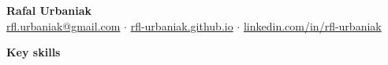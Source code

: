 \documentclass[10pt, a4paper]{article}
\begin{document}




\begin{center}
	
{\sc  \huge \textbf{Rafal Urbaniak}} \\
 \vspace{1mm}
\footnotesize  \href{mailto:rfl.urbaniak@gmail.com}{rfl.urbaniak@gmail.com} \Large $\cdot$ \footnotesize \href{https://rfl-urbaniak.github.io/}{rfl-urbaniak.github.io} \Large $\cdot$ \footnotesize 
 \href{https://www.linkedin.com/in/rfl-urbaniak/}{linkedin.com/in/rfl-urbaniak}

\end{center}

\vspace{-6mm}

\hrulefill 


\vspace{1mm}



\vspace{0mm}
	
\textbf{{\sc \Large Key skills}}\\

\vspace{-4mm}
\end{document}
